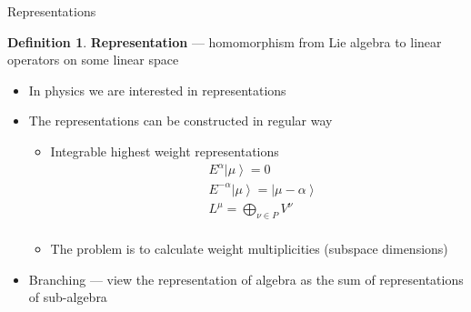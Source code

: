 \documentclass{beamer}
\theoremstyle{definition} \newtheorem{Def}{Definition}
\begin{document}
\begin{frame}{Representations}
  \begin{Def}
    {\bf Representation} --- homomorphism from Lie algebra to linear operators on some linear space
  \end{Def}
  \begin{itemize}
  \item In physics we are interested in representations
  \item The representations can be constructed in regular way
    \begin{itemize}
    \item Integrable highest weight representations
      \begin{equation}
        \label{eq:1}
        \begin{split}
          & E^{\alpha}\left|\mu\right>=0\\
          & E^{-\alpha}\left|\mu\right>=\left|\mu-\alpha\right>\\
          & L^{\mu}=\bigoplus_{\nu\in P} V^{\nu}\\
        \end{split}
      \end{equation}
    \item The problem is to calculate weight multiplicities (subspace dimensions)
    \end{itemize}
  \item Branching --- view the representation of algebra as the sum of representations of sub-algebra
  \end{itemize}
\end{frame}
\end{document}
